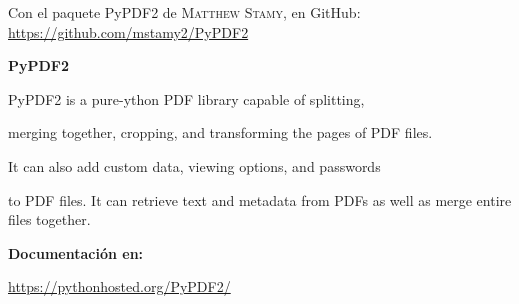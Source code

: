 \documentclass[a5paper]{article}
\begin{document}
\pagebreak

\begin{titlepage}
\vfill

\begin{center}
Con el paquete \textsf{PyPDF2} de \textsc{Matthew Stamy}, en \textsf{GitHub}: \url{https://github.com/mstamy2/PyPDF2}

\vspace{2cm}

\textsf{\textbf{PyPDF2}}

\vspace{0.5cm}

{\footnotesize \textsf{PyPDF2} is a \textsf{pure-ython PDF library} capable of splitting,}

{\footnotesize merging together, cropping, and transforming the pages of PDF files.}

{\footnotesize It can also add custom data, viewing options, and passwords}

{\footnotesize to PDF files. It can retrieve text and metadata from PDFs as well as merge entire files together.}

\end{center}

\vspace{5cm}

\textbf{Documentación en:}

\url{https://pythonhosted.org/PyPDF2/}

\vfill
\end{titlepage}
\end{document}
